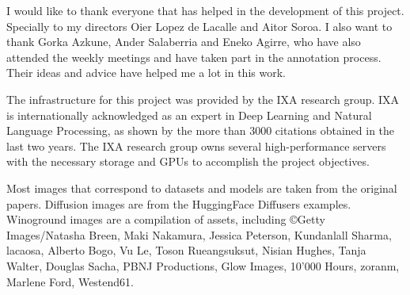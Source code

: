 I would like to thank everyone that has helped in the development of this project. Specially to my directors Oier Lopez de Lacalle and Aitor Soroa. I also want to thank Gorka Azkune, Ander Salaberria and Eneko Agirre, who have also attended the weekly meetings and have taken part in the annotation process. Their ideas and advice have helped me a lot in this work.

The infrastructure for this project was provided by the IXA research group. IXA is internationally acknowledged as an expert in Deep Learning and Natural Language Processing, as shown by the more than 3000 citations obtained in the last two years. The IXA research group owns several high-performance servers with the necessary storage and GPUs to accomplish the project objectives.

Most images that correspond to datasets and models are taken from the original papers. Diffusion images are from the HuggingFace Diffusers examples. Winoground images are a compilation of assets, including \copyright Getty Images/Natasha Breen, Maki Nakamura, Jessica Peterson, Kundanlall Sharma, lacaosa, Alberto Bogo, Vu Le, Toson Rueangsuksut, Nisian Hughes, Tanja Walter, Douglas Sacha, PBNJ Productions, Glow Images, 10'000 Hours, zoranm, Marlene Ford, Westend61.